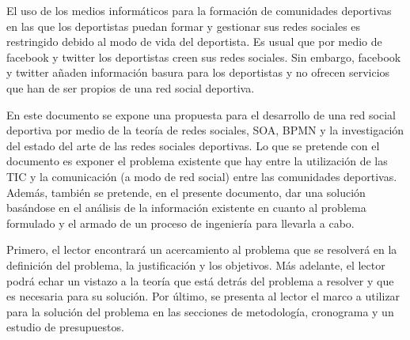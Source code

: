 El uso de los medios informáticos para la formación de comunidades deportivas en las que los deportistas puedan formar y gestionar sus redes sociales es restringido debido al modo de vida del deportista. Es usual que por medio de facebook y twitter los deportistas creen sus redes sociales. Sin embargo, facebook y twitter añaden información basura para los deportistas y no ofrecen servicios que han de ser propios de una red social deportiva.

En este documento se expone una propuesta para el desarrollo de una red social deportiva por medio de la teoría de redes sociales, SOA, BPMN y la investigación del estado del arte de las redes sociales deportivas. Lo que se pretende con el documento es exponer el problema existente que hay entre la utilización de las TIC y la comunicación (a modo de red social) entre las comunidades deportivas. Además, también se pretende, en el presente documento, dar una solución basándose en el análisis de la información existente en cuanto al problema formulado y el armado de un proceso de ingeniería para llevarla a cabo.

Primero, el lector encontrará un acercamiento al problema que se resolverá en la definición del problema, la justificación y los objetivos. Más adelante, el lector podrá echar un vistazo a la teoría que está detrás del problema a resolver y que es necesaria para su solución. Por último, se presenta al lector el marco a utilizar para la solución del problema en las secciones de metodología, cronograma y un estudio de presupuestos.
